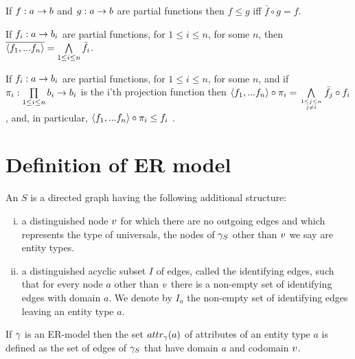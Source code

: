 \begin{lemma}
If $f: a \rightarrow b$ and  $g: a \rightarrow b$ are partial functions then $f \leq g$ iff $\bar{f}\circ g= f$.
\end{lemma}

\begin{lemma}
If $f_i: a \rightarrow b_i$ are partial functions, for $1 \leq i \leq n$, for some $n$, then $\overline{\langle f_1,...f_n\rangle}=\bigwedge\limits_{1 \leq i \leq n}{\bar{f_i}}$.
\end{lemma}

\begin{lemma}
If $f_i: a \rightarrow b_i$ are partial functions, for $1 \leq i \leq n$, for some $n$, and if 
$\pi_i : \prod\limits_{1 \leq i \leq n}{b_i} \rightarrow b_i$ is the i'th projection function 
then  $\tuple{f_1,...f_n} \circ \proji{i} = \bigwedge\limits_{\genfrac{}{}{0pt}{}{1 \leq j \leq n}{ j \neq i}}{\bar{f_j}}\circ f_i$, and,
in particular, $\langle f_1,...f_n\rangle \circ \pi_i\leq f_i$ .
\end{lemma}


\section{Definition of ER model}

\begin{definition}
An  $S$ is a directed graph having the following additional structure:
\begin{enumerate} [(i)]
\item{a distinguished node $v$ for which there are no outgoing edges and which represents the type of universals, 
 the nodes of $\gamma_S$ other than $v$ we say are entity types.} 

\item{a distinguished acyclic subset $I$ of edges, called the identifying edges, such that
for every node $a$ other than $v$ there is a non-empty set  of identifying edges with domain $a$.
 We denote by $I_a$ the non-empty set of identifying edges leaving an entity type $a$.}
\end{enumerate}
\end{definition}

If $\gamma$ is an ER-model then the set $attr_{\gamma}(a)$ of attributes of an entity type $a$ is defined as the set of edges of $\gamma_S$ that have 
domain $a$  and  codomain $v$.

